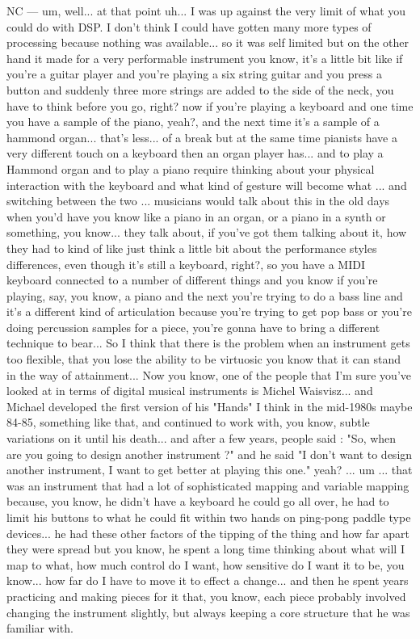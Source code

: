 NC — um, well... at that point uh... I was up against the very limit of what you could do with DSP. I don't think I could have gotten many more types of processing because nothing was available... so it was self limited but on the other hand it made for a very performable instrument you know, it's a little bit like if you're a guitar player and you're playing a six string guitar and you press a button and suddenly three more strings are added to the side of the neck, you have to think before you go, right? now if you're playing a keyboard and one time you have a sample of the piano, yeah?, and the next time it's a sample of a hammond organ... that's less... of a break but at the same time pianists have a very different touch on a keyboard then an organ player has... and to play a Hammond organ and to play a piano require thinking about your physical interaction with the keyboard and what kind of gesture will become what ...  and switching between the two ... musicians would talk about this in the old days when you'd have you know like a piano in an organ, or a piano in a synth or something, you know... they talk about, if you've got them talking about it, how they had to kind of like just think a little bit about the performance styles differences, even though it's still a keyboard, right?, so you have a MIDI keyboard connected to a number of different things and you know if you're playing, say, you know, a piano and the next you're trying to do a bass line and it's a different kind of articulation because you're trying to get pop bass or you're doing percussion samples for a piece, you're gonna have to bring a different technique to bear... So I think that there is the problem when an instrument gets too flexible, that you lose the ability to be virtuosic you know that it can stand in the way of attainment... Now you know, one of the people that I'm sure you've looked at in terms of digital musical instruments is Michel Waisvisz... and Michael developed the first version of his "Hands" I think in the mid-1980s maybe 84-85, something like that, and continued to work with, you know, subtle variations on it until his death... and after a few years, people said : "So, when are you going to design another instrument ?" and he said "I don't want to design another instrument,  I want to get better at playing this one." yeah? ... um ... that was  an instrument that had a lot of sophisticated mapping and variable mapping because, you know, he didn't have a keyboard he could go all over, he had to limit his buttons to what he could fit within two hands on ping-pong paddle type devices... he had these other factors of the tipping of the thing and how far apart they were spread but you know, he spent a long time thinking about what will I map to what, how much control do I want, how sensitive do I want it to be, you know... how far do I have to move it to effect a change... and then he spent years practicing and making pieces for it that, you know, each piece probably involved changing the instrument slightly, but always keeping a core structure that he was familiar with. 

